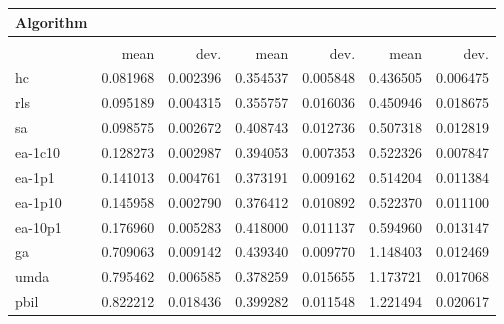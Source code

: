 \begin{tabular}{@{} l *{6}{>{{}}N{1}{2}} @{}}
\toprule
{Algorithm} &  \\
\midrule
&  &  &  \\
\midrule
& {mean} & {dev.} & {mean} & {dev.} & {mean} & {dev.} \\
\midrule
hc & 0.081968 & 0.002396 & 0.354537 & 0.005848 & 0.436505 & 0.006475 \\
rls & 0.095189 & 0.004315 & 0.355757 & 0.016036 & 0.450946 & 0.018675 \\
sa & 0.098575 & 0.002672 & 0.408743 & 0.012736 & 0.507318 & 0.012819 \\
ea-1c10 & 0.128273 & 0.002987 & 0.394053 & 0.007353 & 0.522326 & 0.007847 \\
ea-1p1 & 0.141013 & 0.004761 & 0.373191 & 0.009162 & 0.514204 & 0.011384 \\
ea-1p10 & 0.145958 & 0.002790 & 0.376412 & 0.010892 & 0.522370 & 0.011100 \\
ea-10p1 & 0.176960 & 0.005283 & 0.418000 & 0.011137 & 0.594960 & 0.013147 \\
ga & 0.709063 & 0.009142 & 0.439340 & 0.009770 & 1.148403 & 0.012469 \\
umda & 0.795462 & 0.006585 & 0.378259 & 0.015655 & 1.173721 & 0.017068 \\
pbil & 0.822212 & 0.018436 & 0.399282 & 0.011548 & 1.221494 & 0.020617 \\
\bottomrule
\end{tabular}
